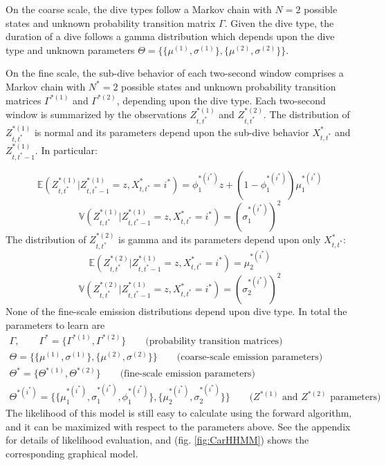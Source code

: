 On the coarse scale, the dive types follow a Markov chain with $N=2$ possible states and unknown probability transition matrix $\Gamma$. Given the dive type, the duration of a dive follows a gamma distribution which depends upon the dive type and unknown parameters $\Theta = \{\{\mu^{(1)},\sigma^{(1)}\},\{\mu^{(2)},\sigma^{(2)}\}\}$.

On the fine scale, the sub-dive behavior of each two-second window comprises a Markov chain with $N^*=2$ possible states and unknown probability transition matrices $\Gamma^{*(1)}$ and $\Gamma^{*(2)}$, depending upon the dive type. Each two-second window is summarized by the observations $Z^{*(1)}_{t,t^*}$ and $Z^{*(2)}_{t,t^*}$. The distribution of $Z^{*(1)}_{t,t^*}$ is normal and its parameters depend upon the sub-dive behavior $X^*_{t,t^*}$ and $Z^{*(1)}_{t,t^*-1}$. In particular:

$$\mathbb{E}(Z^{*(1)}_{t,t^*}|Z^{*(1)}_{t,t^*-1} = z,X^*_{t,t^*} = i^*) = \phi_1^{*(i^*)}z + (1-\phi_1^{*(i^*)}) \mu_1^{*(i^*)}$$
$$\mathbb{V}(Z^{*(1)}_{t,t^*}|Z^{*(1)}_{t,t^*-1} = z,X^*_{t,t^*} = i^*) = \left(\sigma_1^{*(i^*)}\right)^2$$
%
The distribution of $Z^{*(2)}_{t,t^*}$ is gamma and its parameters depend upon only $X^*_{t,t^*}$:
%
$$\mathbb{E}(Z^{*(2)}_{t,t^*}|Z^{*(1)}_{t,t^*-1} = z,X^*_{t,t^*} = i^*) = \mu_2^{*(i^*)}$$
$$\mathbb{V}(Z^{*(2)}_{t,t^*}|Z^{*(1)}_{t,t^*-1} = z,X^*_{t,t^*} = i^*) = (\sigma_2^{*(i^*)})^2$$
%
None of the fine-scale emission distributions depend upon dive type. In total the parameters to learn are
%
\begin{gather*}
    \Gamma, \qquad \Gamma^{*} = \{\Gamma^{*(1)},\Gamma^{*(2)}\} \qquad \text{(probability transition matrices)} \\
    \Theta = \{\{\mu^{(1)},\sigma^{(1)}\},\{\mu^{(2)},\sigma^{(2)}\}\} \qquad \text{(coarse-scale emission parameters)} \\
    \Theta^* = \{\Theta^{*(1)},\Theta^{*(2)}\}  \qquad \text{(fine-scale emission parameters)} \\
    \Theta^{*(i^*)} =  \{\{\mu_1^{*(i^*)},\sigma_1^{*(i^*)},\phi_1^{*(i^*)}\},\{\mu_2^{*(i^*)},\sigma_2^{*(i^*)}\}\} \qquad \text{(}Z^{*(1)} \text{ and } Z^{*(2)} \text{ parameters)}
\end{gather*}
%
The likelihood of this model is still easy to calculate using the forward algorithm, and it can be maximized with respect to the parameters above. See the appendix for details of likelihood evaluation, and (fig. \ref{fig:CarHHMM}) shows the corresponding graphical model.

